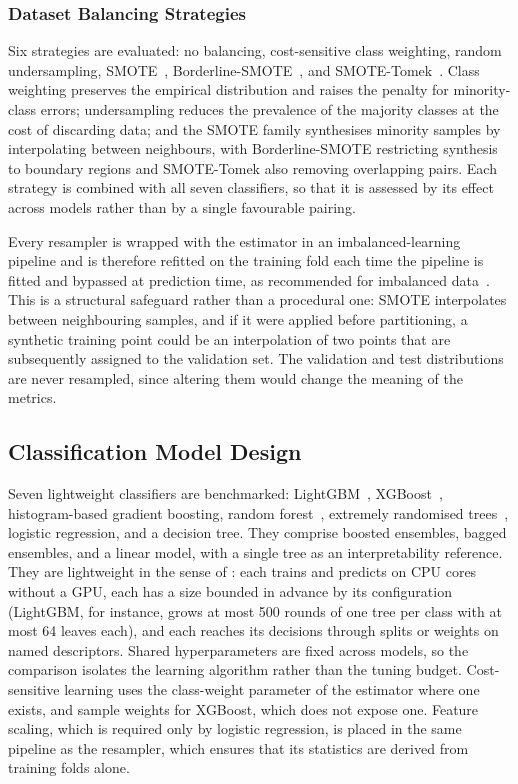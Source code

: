\subsubsection{Dataset Balancing Strategies}
\label{sec:chap3Balancing}
Six strategies are evaluated: no balancing, cost-sensitive class weighting, random undersampling, SMOTE~\cite{chawla2002smote}, Borderline-SMOTE~\cite{han2005borderline}, and SMOTE-Tomek~\cite{batista2004balancing}. Class weighting preserves the empirical distribution and raises the penalty for minority-class errors; undersampling reduces the prevalence of the majority classes at the cost of discarding data; and the SMOTE family synthesises minority samples by interpolating between neighbours, with Borderline-SMOTE restricting synthesis to boundary regions and SMOTE-Tomek also removing overlapping pairs. Each strategy is combined with all seven classifiers, so that it is assessed by its effect across models rather than by a single favourable pairing.

Every resampler is wrapped with the estimator in an imbalanced-learning pipeline and is therefore refitted on the training fold each time the pipeline is fitted and bypassed at prediction time, as recommended for imbalanced data~\cite{santos2018imbalanced}. This is a structural safeguard rather than a procedural one: SMOTE interpolates between neighbouring samples, and if it were applied before partitioning, a synthetic training point could be an interpolation of two points that are subsequently assigned to the validation set. The validation and test distributions are never resampled, since altering them would change the meaning of the metrics.

\subsection{Classification Model Design}
\label{sec:chap3Phase4}
Seven lightweight classifiers are benchmarked: LightGBM~\cite{ke2017lightgbm}, XGBoost~\cite{chen2016xgboost}, histogram-based gradient boosting, random forest~\cite{breiman2001randomforests}, extremely randomised trees~\cite{geurts2006extremely}, logistic regression, and a decision tree. They comprise boosted ensembles, bagged ensembles, and a linear model, with a single tree as an interpretability reference. They are lightweight in the sense of : each trains and predicts on CPU cores without a GPU, each has a size bounded in advance by its configuration (LightGBM, for instance, grows at most 500 rounds of one tree per class with at most 64 leaves each), and each reaches its decisions through splits or weights on named descriptors. Shared hyperparameters are fixed across models, so the comparison isolates the learning algorithm rather than the tuning budget. Cost-sensitive learning uses the class-weight parameter of the estimator where one exists, and sample weights for XGBoost, which does not expose one. Feature scaling, which is required only by logistic regression, is placed in the same pipeline as the resampler, which ensures that its statistics are derived from training folds alone.

